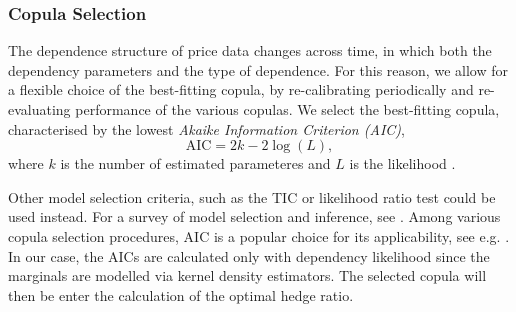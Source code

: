 
\subsubsection{Copula Selection}\label{subsec:copula-selection}
The dependence structure of price data changes across time, in which
both the dependency parameters and the type of dependence.
For this reason, we allow for a flexible choice of the best-fitting copula, by re-calibrating periodically and re-evaluating performance of the various copulas.
We select the best-fitting copula, characterised by the lowest {\em Akaike Information Criterion (AIC)},
\begin{equation*}
 \text{AIC} = 2k- 2 \log(L),
\end{equation*}
where $k$ is the number of estimated
parameteres and $L$ is the likelihood \citep{Akaike1973}. 

Other model selection criteria, such as the TIC\citep{Takeuchi1976} or likelihood ratio test could be used instead.
For a survey of model selection and inference, see \cite{anderson1998comparison}.
Among various copula selection procedures, AIC is a popular choice for
its applicability, see e.g. \cite{breymann2003dependence}.
In our case, the AICs are calculated only with dependency likelihood
since the marginals are modelled via kernel density estimators.
The selected copula will then be enter the calculation of the optimal
hedge ratio.


